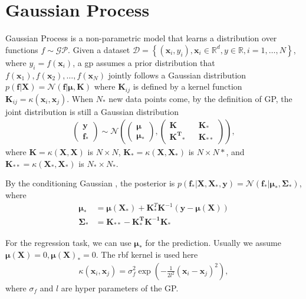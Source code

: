 \section{Gaussian Process}
\label{sec:gp}
Gaussian Process is a non-parametric model that learns a distribution over functions $f\sim \mathcal{GP}$.
Given a dataset 
$\mathcal{D} = \left\{(\mathbf{x}_i, y_i), \mathbf{x}_i \in \mathbb{R}^d, y \in \mathbb{R}, i=1,\dots, N \right\}$, 
where $y_{i} = f(\mathbf{x}_i)$, 
a \gls{gp} assumes a prior distribution that 
$f(\mathbf{x}_{1}), f(\mathbf{x}_{2}), \dots, f(\mathbf{x}_{N})$ 
jointly follows a Gaussian distribution $p(\mathbf{f}|\mathbf{X}) = \mathcal{N}(\mathbf{f}|\mathbf{\mu}, \mathbf{K})$
where $\mathbf{K}_{ij}$ is defined by a kernel function $\mathbf{K}_{ij} = \kappa(\mathbf{x}_i, \mathbf{x}_j)$.
When $N_{*}$ new data points come, by the definition of GP, the joint distribution is still a Gaussian distribution
\begin{align}
\begin{pmatrix} \mathbf{y}\\ \mathbf{f_*}\end{pmatrix} \sim \mathcal{N}\left(
\begin{pmatrix} \mathbf{\mu} \\ \mathbf{\mu}_{*}\end{pmatrix}, 
\begin{pmatrix} \mathbf{K} && \mathbf{K}_*\\ \mathbf{K^T}_* && \mathbf{K}_{**}\end{pmatrix}
\right),
\end{align}
where $\mathbf{K}=\kappa(\mathbf{X}, \mathbf{X})$ is $N\times N$, $\mathbf{K}_*=\kappa(\mathbf{X}, \mathbf{X}_*)$ is $N\times N{*}$, and $\mathbf{K}_{**}=\kappa(\mathbf{X}_*, \mathbf{X}_*)$ is $N_*\times N_*$.

By the conditioning Gaussian \cite{rasmussen2003gaussian}, the posterior is $p(\mathbf{f}_*|\mathbf{X}, \mathbf{X}_*, \mathbf{y}) = \mathcal{N}(\mathbf{f}_*|\mathbf{\mu}_*, \mathbf{\Sigma}_*)$, where
\begin{align}
\mathbf{\mu}_* & = \mathbf{\mu(X_*)} + \mathbf{K}^T_*\mathbf{K}^{-1}(\mathbf{y-\mu(X)})\\
\mathbf{\Sigma}_* & = \mathbf{K_{**}-K_*^TK^{-1}K_*}
\label{eq:gp-predict}
\end{align}

For the regression task, we can use $\mathbf{\mu}_*$ for the prediction.
Usually we assume $\mathbf{\mu(X)} = 0, \mathbf{\mu(X)}_* = 0$. The \gls{rbf} kernel is used here
\begin{align}
\kappa(\mathbf{x}_i, \mathbf{x}_j) = \sigma_f^2 \exp\left(-\frac{1}{2l^2}(\mathbf{x}_i-\mathbf{x}_j)^2\right),
\end{align}
where $\sigma_{f}$ and $l$ are hyper parameters of the GP.

